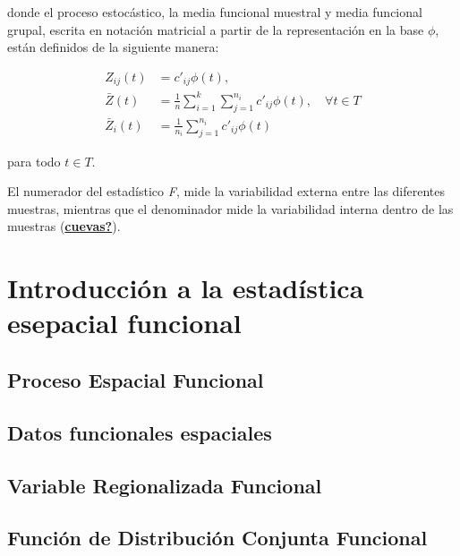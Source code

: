 \documentclass[
]{book}
\begin{document}
donde el proceso estocástico, la media funcional muestral y media funcional grupal, escrita en notación matricial a partir de la representación en la base \(\phi\), están definidos de la siguiente manera:

\begin{align}
    Z_{ij}(t)&=c'_{ij}\phi(t),\\
    \bar{Z}(t)&=\frac{1}{n}\sum_{i=1}^k\sum_{j=1}^{n_i} c'_{ij}\phi(t), \quad \forall t\in T\\
    \bar{Z}_i(t)&=\frac{1}{n_i}\sum_{j=1}^{n_i}c'_{ij}\phi(t)
\end{align}

para todo \(t\in T\).

El numerador del estadístico \textit{F}, mide la variabilidad externa entre las diferentes muestras, mientras que el denominador mide la variabilidad interna dentro de las muestras (\protect\hyperlink{ref-cuevas}{\textbf{cuevas?}}).

\hypertarget{introducciuxf3n-a-la-estaduxedstica-esepacial-funcional}{%
\chapter{Introducción a la estadística esepacial funcional}\label{introducciuxf3n-a-la-estaduxedstica-esepacial-funcional}}

\hypertarget{proceso-espacial-funcional}{%
\section{Proceso Espacial Funcional}\label{proceso-espacial-funcional}}

\hypertarget{datos-funcionales-espaciales}{%
\section{Datos funcionales espaciales}\label{datos-funcionales-espaciales}}

\hypertarget{variable-regionalizada-funcional}{%
\section{Variable Regionalizada Funcional}\label{variable-regionalizada-funcional}}

\hypertarget{funciuxf3n-de-distribuciuxf3n-conjunta-funcional}{%
\section{Función de Distribución Conjunta Funcional}\label{funciuxf3n-de-distribuciuxf3n-conjunta-funcional}}
\end{document}

